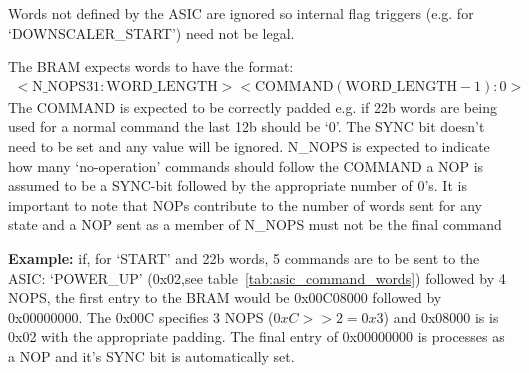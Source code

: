 \documentclass[]{article}
\begin{document}
      Words not defined by the ASIC are ignored so internal flag triggers (e.g. for `DOWNSCALER\_START') need not be legal.

      The BRAM expects words to have the format:
      \begin{align}\label{fmt:tx_bram}
        <\text{N\_NOPS} 31:\text{WORD\_LENGTH}><\text{COMMAND} (\text{WORD\_LENGTH} - 1):0>
      \end{align}
      The COMMAND is expected to be correctly padded e.g. if 22b words are being used for a normal command the last 12b should be `0'. The SYNC bit doesn't need to be set and any value will be ignored. N\_NOPS is expected to indicate how many `no-operation' commands should follow the COMMAND a NOP is assumed to be a SYNC-bit followed by the appropriate number of 0's. It is important to note that NOPs contribute to the number of words sent for any state and a NOP sent as a member of N\_NOPS must not be the final command

      \textbf{Example:} if, for `START' and 22b words, 5 commands are to be sent to the ASIC: `POWER\_UP' (0x02,see table~\ref{tab:asic_command_words}) followed by 4 NOPS, the first entry to the BRAM would be 0x00C08000 followed by 0x00000000. The 0x00C specifies 3 NOPS (\(0xC>>2 = 0x3\)) and 0x08000 is is 0x02 with the appropriate padding. The final entry of 0x00000000 is processes as a NOP and it's SYNC bit is automatically set.
\end{document}
